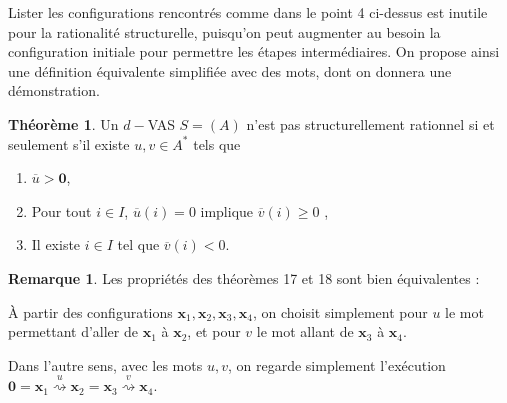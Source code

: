 \documentclass[a4paper,final]{article}
\theoremstyle{definition}
\newtheorem{Theorem}{Théorème}
\newtheorem*{Remark}{Remarque}
\let\geq\geqslant
\newcommand{\transZ}[1]{\ensuremath{\stackrel{#1}{\rightsquigarrow}}}
\newcommand{\vect}[1]{\ensuremath{\mathbf{#1}}}
\newcommand{\valeur}[1]{\ensuremath{\overline{#1}}}
\begin{document}
Lister les configurations rencontrés comme dans le point 4 ci-dessus est inutile pour la rationalité structurelle, puisqu'on peut augmenter au besoin la configuration initiale  pour permettre les étapes intermédiaires.
On propose ainsi une définition équivalente simplifiée avec des mots, dont on donnera une démonstration.


\begin{Theorem}\label{conf_struct_rat}
Un $d-$VAS $S=(A)$ n'est pas structurellement rationnel si et seulement s'il existe $u,v\in A^*$ tels que 
\begin{enumerate}
    \item $\valeur{u} > \vect{0}$,
    \item Pour tout $i \in I$, $\valeur{u}(i)=0$ implique $\valeur{v}(i) \geq 0$ ,
    \item Il existe $i\in I$ tel que $\valeur{v}(i) < 0$.
\end{enumerate}
\end{Theorem}

\begin{Remark}
Les propriétés des théorèmes 17 et 18 sont bien équivalentes :

\noindent À partir des configurations $\vect{x}_1, \vect{x}_2, \vect{x}_3, \vect{x}_4$, on choisit simplement pour $u$ le mot permettant d'aller de $\vect{x}_1$ à $\vect{x}_2$, et pour $v$ le mot allant de $\vect{x}_3$ à $\vect{x}_4$.

\noindent Dans l'autre sens, avec les mots $u,v$, on regarde simplement l'exécution $\vect{0} = \vect{x}_1 \transZ{u} \vect{x}_2 = \vect{x}_3 \transZ{v} \vect{x}_4$.
\end{Remark}
\end{document}
